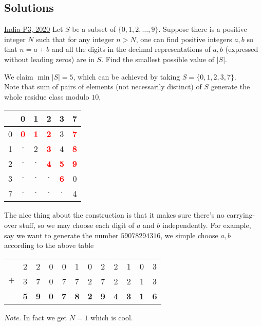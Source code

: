 \subsection{Solutions}
\begin{problem}{1}{\href{https://artofproblemsolving.com/community/c6h1989008p34732913}{India P3, 2020}}
	Let $S$ be a subset of $\{0,1,2,\dots ,9\}$. Suppose there is a positive integer $N$ such that for any integer $n>N$, one can find positive integers $a,b$ so that $n=a+b$ and all the digits in the decimal representations of $a,b$ (expressed without leading zeros) are in $S$. Find the smallest possible value of $|S|$.
	\begin{solution} We claim $\min |S|=5$, which can be achieved by taking $S=\{0,1,2,3,7\}$.\\

	 Note that sum of pairs of elements (not necessarily distinct) of $S$ generate the whole residue class modulo $10$,
	\begin{center}\begin{tabular}{c| c c  c c c}
& 0 & 1 & 2 & 3 & 7\\
\hline
0 & \textcolor{red}{\textbf{0}} & \textcolor{red}{\textbf{1}} & \textcolor{red}{\textbf{2}} & 3 & \textcolor{red}{\textbf{7}}\\ 
1 & $\cdot$ & 2 & \textcolor{red}{\textbf{3}} & 4 & \textcolor{red}{\textbf{8}}\\ 
2 & $\cdot$ & $\cdot$ & \textcolor{red}{\textbf{4}} & \textcolor{red}{\textbf{5}} & \textcolor{red}{\textbf{9}}\\ 
3 & $\cdot$ & $\cdot$ & $\cdot$ & \textcolor{red}{\textbf{6}} & 0\\ 
7 & $\cdot$ & $\cdot$ & $\cdot$ & $\cdot$ & 4\\ 
\end{tabular}\end{center}
	\indent The nice thing about the construction is that it makes sure there's no carrying-over stuff, so we may choose each digit of $a$ and $b$ independently. For example, say we want to generate the number $59078294316$, we simple choose $a,b$ according to the above table
	\begin{center}\begin{tabular}{c c c c c c c c c c c c}
        & 2 & 2 & 0 & 0 & 1 & 0 & 2 & 2 & 1 & 0 & 3\\
$+$ & 3 & 7 & 0 & 7 & 7 & 2 & 7 & 2 & 2 & 1 & 3\\
\hline
& \textbf{5} & \textbf{9} & \textbf{0} & \textbf{7} & \textbf{8} & \textbf{2} & \textbf{9} & \textbf{4} & \textbf{3} & \textbf{1} & \textbf{6}
\end{tabular}\end{center}
	\noindent \emph{Note.} In fact we get $N=1$ which is cool.\\


\end{solution}
\end{problem}
